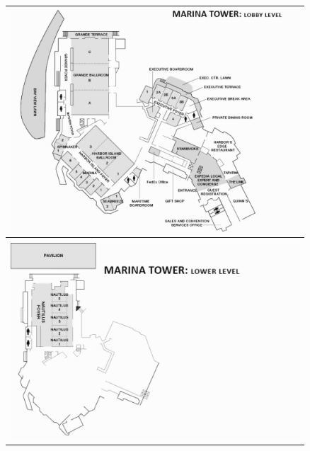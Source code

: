 
\thispagestyle{empty}
\begin{center}
  \begin{tabular}{r}
    \includegraphics[width=4.25in]{content/hotel-map-1.jpg} \\
    \hline \\
    \includegraphics[width=4.25in]{content/hotel-map-2.jpg}
  \end{tabular}
\end{center}

